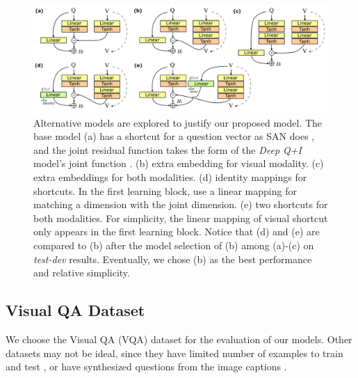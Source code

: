 \documentclass{article}
\begin{document}
\begin{figure}[t]
\centering
\includegraphics[width=\linewidth]{alternatives}
\caption{Alternative models are explored to justify our proposed model. The base model (a) has a shortcut for a question vector as SAN does \cite{Yang2015}, and the joint residual function takes the form of the \textit{Deep Q+I} model's joint function \cite{Lu2015}. (b) extra embedding for visual modality. (c) extra embeddings for both modalities. (d) identity mappings for shortcuts. In the first learning block, use a linear mapping for matching a dimension with the joint dimension. (e) two shortcuts for both modalities. For simplicity, the linear mapping of visual shortcut only appears in the first learning block. Notice that (d) and (e) are compared to (b) after the model selection of (b) among (a)-(c) on \textit{test-dev} results. Eventually, we chose (b) as the best performance and relative simplicity.}
\label{fig:alternatives}
\end{figure}

\subsection{Visual QA Dataset}


We choose the Visual QA (VQA) dataset \cite{Antol2015} for the evaluation of our models. Other datasets may not be ideal, since they have limited number of examples to train and test \cite{Malinowski2015}, or have synthesized questions from the image captions \cite{Lin2014,Ren2015}.
\end{document}
